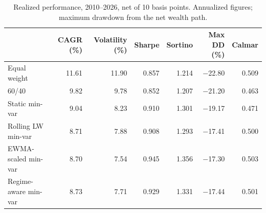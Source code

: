 \begin{table}[htbp]
\caption{Realized performance, 2010--2026, net of 10 basis points. Annualized figures; maximum drawdown from the net wealth path.}
\label{tab:table1_performance}
\small
\begin{tabular}{lrrrrrr}
\toprule
 & CAGR (\%) & Volatility (\%) & Sharpe & Sortino & Max DD (\%) & Calmar \\
\midrule
Equal weight & 11.61 & 11.90 & 0.857 & 1.214 & $-$22.80 & 0.509 \\
60/40 & 9.82 & 9.78 & 0.852 & 1.207 & $-$21.20 & 0.463 \\
Static min-var & 9.04 & 8.23 & 0.910 & 1.301 & $-$19.17 & 0.471 \\
Rolling LW min-var & 8.71 & 7.88 & 0.908 & 1.293 & $-$17.41 & 0.500 \\
EWMA-scaled min-var & 8.70 & 7.54 & 0.945 & 1.356 & $-$17.30 & 0.503 \\
Regime-aware min-var & 8.73 & 7.71 & 0.929 & 1.331 & $-$17.44 & 0.501 \\
\bottomrule
\end{tabular}
\end{table}
